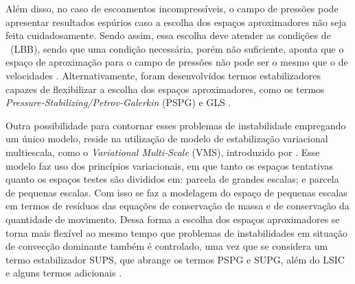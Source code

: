 
Além disso, no caso de escoamentos incompressíveis, o campo de pressões pode apresentar resultados espúrios caso a escolha dos espaços aproximadores não seja feita cuidadosamente. Sendo assim, essa escolha deve atender as condições de \LBB\ (LBB), sendo que uma condição necessária, porém não suficiente, aponta que o espaço de aproximação para o campo de pressões não pode ser o mesmo que o de velocidades \cite{BrezziF1991,donea2003finite,fernandes2020tecnica}. Alternativamente, foram desenvolvidos termos estabilizadores capazes de flexibilizar a escolha dos espaços aproximadores, como os termos \textit{Pressure-Stabilizing/Petrov-Galerkin} (PSPG) e GLS \cite{TezduyarS2003}.

Outra possibilidade para contornar esses problemas de instabilidade empregando um único modelo, reside na utilização de modelo de estabilização variacional multiescala, como o \textit{Variational Multi-Scale} (VMS), introduzido por . Esse modelo faz uso dos princípios variacionais, em que tanto os espaços tentativas quanto os espaços testes são divididos em: parcela de grandes escalas; e parcela de pequenas escalas. Com isso se faz a modelagem do espaço de pequenas escalas em termos de resíduos das equações de conservação de massa e de conservação da quantidade de movimento. Dessa forma a escolha dos espaços aproximadores se torna mais flexível ao mesmo tempo que problemas de instabilidades em situação de convecção dominante também é controlado, uma vez que se considera um termo estabilizador SUPS, que abrange os termos PSPG e SUPG, além do LSIC e alguns termos adicionais \cite{bazilevs2013computational,sondak2015new}.

